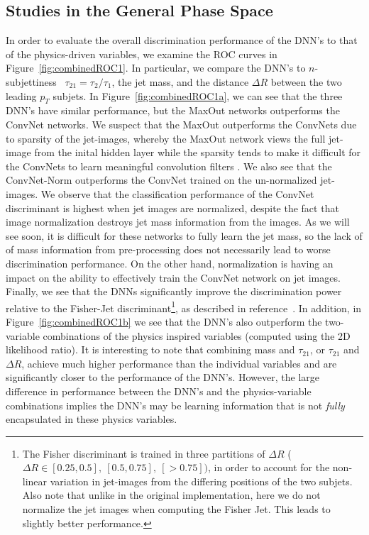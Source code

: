
\subsection{Studies in the General Phase Space} %
\label{sub:coarse_studies}

In order to evaluate the overall discrimination performance of the DNN's to that of the physics-driven variables, we examine the ROC curves in Figure~\ref{fig:combinedROC1}. In particular, we compare the DNN's to $n$-subjettiness~\cite{nsub} $\tau_{21} = \tau_{2}/\tau_{1}$, the jet mass, and the distance $\Delta R$ between the two leading $p_{T}$ subjets.  In Figure~\ref{fig:combinedROC1a}, we can see that the three DNN's have similar performance, but the MaxOut networks outperforms the ConvNet networks.  We suspect that the MaxOut outperforms the ConvNets due to sparsity of the jet-images, whereby the MaxOut network views the full jet-image from the inital hidden layer while the sparsity tends to make it difficult for the ConvNets to learn meaningful convolution filters .  We also see that the ConvNet-Norm outperforms the ConvNet trained on the un-normalized jet-images.  We observe that the classification performance of the ConvNet discriminant is highest when jet images are normalized, despite the fact that image normalization destroys jet mass information from the images. As we will see soon, it is difficult for these networks to fully learn the jet mass, so the lack of of mass information from pre-processing does not necessarily lead to worse discrimination performance. On the other hand, normalization is having an impact on the ability to effectively train the ConvNet network on jet images.  Finally, we see that the DNNs significantly improve the discrimination power relative to the Fisher-Jet discriminant\footnote{The Fisher discriminant is trained in three partitions of $\Delta  R$ ($\Delta R \in [0.25, 0.5],\ [0.5, 0.75],\ [>0.75])$, in order to account for the non-linear variation in jet-images from the differing positions of the two subjets.  Also note that unlike in the original implementation, here we do not normalize the jet images when computing the Fisher Jet.  This leads to slightly better performance.}, as described in reference~\cite{Cogan:2014oua}. In addition, in Figure~\ref{fig:combinedROC1b} we see that the DNN's also outperform the two-variable combinations of the physics inspired variables (computed using the 2D likelihood ratio).   It is interesting to note that combining mass and $\tau_{21}$, or $\tau_{21}$ and $\Delta R$, achieve much higher performance than the individual variables and are significantly closer to the performance of the DNN's.  However, the large difference in performance between the DNN's and the physics-variable combinations implies the DNN's may be learning information that is not \emph{fully} encapsulated in these physics variables.
